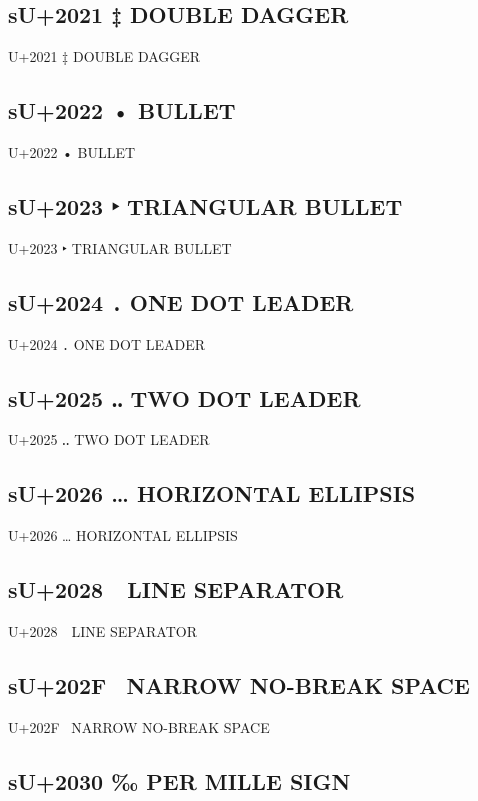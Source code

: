 \subsection{sU+2021 ‡  DOUBLE DAGGER}

U+2021 ‡  DOUBLE DAGGER

\subsection{sU+2022 •  BULLET}

U+2022 •  BULLET

\subsection{sU+2023 ‣ TRIANGULAR BULLET}

U+2023 ‣ TRIANGULAR BULLET

\subsection{sU+2024 ․ ONE DOT LEADER}

U+2024 ․ ONE DOT LEADER

\subsection{sU+2025 ‥ TWO DOT LEADER}

U+2025 ‥ TWO DOT LEADER

\subsection{sU+2026 …  HORIZONTAL ELLIPSIS}

U+2026 …  HORIZONTAL ELLIPSIS

\subsection{sU+2028   LINE SEPARATOR}

U+2028   LINE SEPARATOR

\subsection{sU+202F   NARROW NO-BREAK SPACE}

U+202F   NARROW NO-BREAK SPACE

\subsection{sU+2030 ‰  PER MILLE SIGN}

